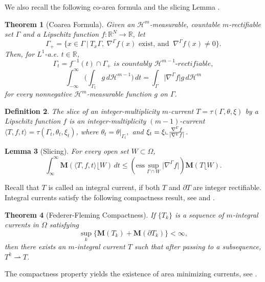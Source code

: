\documentclass{amsart}
\numberwithin{equation}{section}
\newtheorem{theorem}{Theorem}[section]
\newtheorem{lemma}[theorem]{Lemma}
\theoremstyle{definition}
\newtheorem{definition}[theorem]{Definition}
\theoremstyle{remark}
\begin{document}
We also recall the following co-area formula and the slicing Lemma \cite[Theorem 7.6]{Krantz}.

\begin{theorem}[Coarea Formula] Given an $\mathcal{H}^m$-measurable, countable $m$-rectifiable set $\Gamma$ and a Lipschitz function $f:\mathbb{R}^N \to \mathbb{R}$, let 
$$\Gamma_+ =\Big\{ x \in \Gamma\ \big|\ T_x\Gamma,\  \nabla^\Gamma f(x) \text{ exist,\  and }\ \nabla^\Gamma f(x) \neq 0 \Big\}.$$
Then, for $L^1$-a.e. $t \in \mathbb{R}$,
 \[\Gamma_t = f^{-1}(t) \cap \Gamma_+  \textit{ is countably } \mathcal{H}^{m-1}\textit{-rectifiable}, \]
 \[\int_{- \infty}^\infty \big( \int_{\Gamma_t} g \,d\mathcal{H}^{m-1} \big)\, dt = \int_{\Gamma} \big|\nabla^\Gamma f\big|g \, d\mathcal{H}^m\]
for every nonnegative $\mathcal{H}^m$-measurable function $g$ on $\Gamma$.
\end{theorem}

\begin{definition} \textit{The slice of an integer-multiplicity $m$-current $T = \tau(\Gamma, \theta, \xi)$ \textit{by a Lipschitz function} $f$ \textit{is an integer-multiplicity} $(m-1)$\textit{-current} $\langle T, f ,t \rangle  = \tau(\Gamma_t, \theta_t, \xi_t)$, \textit{where} $\theta_t = \theta \vert_{\Gamma_t},$ \textit{and} $\xi_t = \xi \large\llcorner \frac{\nabla^\Gamma f}{|\nabla^\Gamma f|}$.}
\end{definition}

\begin{lemma}[Slicing] For every open set $W \subset \Omega$,
\[ \int_\infty^\infty \mathbf{M}(\langle T, f, t \rangle\lfloor{W} ) \,dt \leq (\text{ess} \sup_{\Gamma \cap W} 
\big|\nabla^\Gamma f\big|) \mathbf{M}(T\lfloor W). \]
\end{lemma}
 
 Recall that $T$ is called an integral current, if both $T$ and $\partial T$ are integer rectifiable. 
 Integral currents satisfy the following compactness result, see \cite{Federer60} and \cite[Lemma 6.3.11]{Simon}.



\begin{theorem}[Federer-Fleming Compactness] If $\{ T_k \}$ is a sequence of $m$-integral currents in $\Omega$ satisfying
\[ \sup_k\Big\{\mathbf{M}(T_k) +\mathbf{M}(\partial T_k)\Big\} < \infty, \]
then there exists an $m$-integral current $T$ such that after passing to a subsequence,
$T^k\rightharpoonup T$.
\end{theorem}
The compactness property yields the existence of area minimizing currents, see \cite[Lemma 7.2.1]{Simon}.
\end{document}
